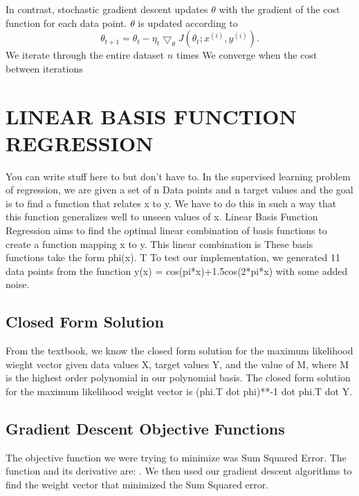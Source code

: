 \documentclass[a4paper,twoside]{article}
\begin{document}
In contrast, stochastic gradient descent updates $\theta$ with the gradient of the cost function for each data point. $\theta$ is updated according to 
\begin{equation}
\theta_{t+1} = \theta_t - \eta_t \bigtriangledown_\theta J(\theta_t; x^{(i)}, y^{(i)}).
\end{equation}
 We iterate through the entire dataset $n$ times  We converge when the cost between iterations 



\section{\uppercase{Linear Basis Function Regression}}

You can write stuff here to but don't have to. In the supervised learning problem of regression, we are given a set of n Data points and n target values and the goal is to find a function that relates x to y. We have to do this in such a way that this function generalizes well to unseen values of x. Linear Basis Function Regression aims to find the optimal linear combination of basis functions to create a function mapping x to y. This linear combination is These basis functions take the form phi(x). T To test our implementation, we generated 11 data points from the function y(x) = cos(pi*x)+1.5cos(2*pi*x) with some added noise. 

\subsection{Closed Form Solution}

From the textbook, we know the closed form solution for the maximum likelihood wieght vector given data values X, target values Y, and the value of M, where M is the highest order polynomial in our polynomial basis. The closed form solution for the maximum likelihood weight vector is (phi.T dot phi)**-1 dot phi.T dot Y. 

\subsection{Gradient Descent Objective Functions}

The objective function we were trying to minimize was Sum Squared Error. The function and its derivative are: . We then used our gradient descent algorithms to find the weight vector that minimized the Sum Squared error. 
\end{document}
